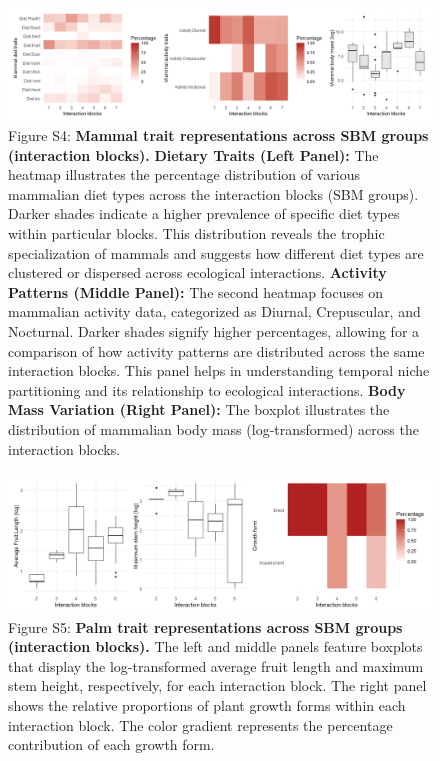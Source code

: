 \documentclass[
]{agujournal2019}
\begin{document}
\begin{figure}[H]

{\centering \includegraphics{Sup_figures/Trait_associations.png}

}

\caption{Figure S4: \textbf{Mammal trait representations across SBM
groups (interaction blocks).} \textbf{Dietary Traits (Left Panel):} The
heatmap illustrates the percentage distribution of various mammalian
diet types across the interaction blocks (SBM groups). Darker shades
indicate a higher prevalence of specific diet types within particular
blocks. This distribution reveals the trophic specialization of mammals
and suggests how different diet types are clustered or dispersed across
ecological interactions. \textbf{Activity Patterns (Middle Panel):} The
second heatmap focuses on mammalian activity data, categorized as
Diurnal, Crepuscular, and Nocturnal. Darker shades signify higher
percentages, allowing for a comparison of how activity patterns are
distributed across the same interaction blocks. This panel helps in
understanding temporal niche partitioning and its relationship to
ecological interactions. \textbf{Body Mass Variation (Right Panel):} The
boxplot illustrates the distribution of mammalian body mass
(log-transformed) across the interaction blocks.}

\end{figure}%
\begin{figure}[H]

{\centering \includegraphics{Sup_figures/00_palm_trait_decomposition.png}

}

\caption{Figure S5: \textbf{Palm trait representations across SBM groups
(interaction blocks).} The left and middle panels feature boxplots that
display the log-transformed average fruit length and maximum stem
height, respectively, for each interaction block. The right panel shows
the relative proportions of plant growth forms within each interaction
block. The color gradient represents the percentage contribution of each
growth form.}

\end{figure}%
\end{document}
